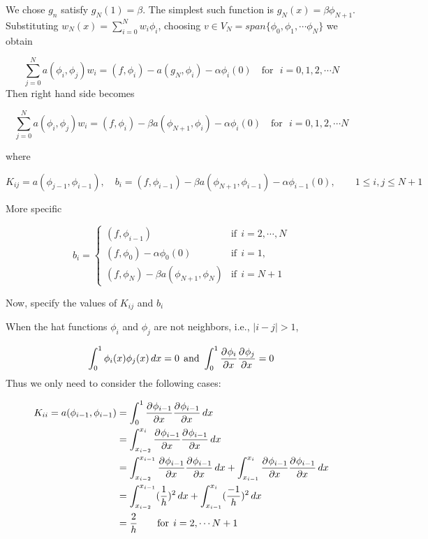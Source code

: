 {\begin{solution}
\begin{enumerate}
We chose $g_n$ satisfy $g_N(1) = \beta$. The simplest such function is $g_N(x)= \beta \phi_{N+1}$. Substituting $w_N(x)= \sum_{i=0}^{N} w_i \phi_i$,  choosing $v \in V_N= span\{\phi_0, \phi_1, \cdots \phi_N\}$ we obtain

\[
\sum_{j=0}^{N} a(\phi_i,\phi_j) w_i = (f,\phi_i)-a(g_N, \phi_i)-\alpha \phi_i (0) \quad \mbox{for} \:\:\: i=0,1, 2,\cdots N
\]
Then right hand side becomes

\[
\sum_{j=0}^{N} a(\phi_i,\phi_j) w_i = (f,\phi_i)- \beta a(\phi_{N+1}, \phi_i)-\alpha \phi_i (0)  \quad \mbox{for} \:\:\: i=0,1, 2,\cdots N
\]

where 

\[
K_{ij} = a(\phi_{j-1},\phi_{i-1}), \quad b_i = (f,\phi_{i-1}) -\beta a(\phi_{N+1}, \phi_{i-1})-\alpha \phi_{i-1} (0), \qquad 1 \leq i, j \leq N+1
\]

More specific

\[
b_i = \begin{cases}
(f,\phi_{i-1})  & \mbox{if} \:\: i= 2,\cdots, N\\
(f,\phi_{0}) - \alpha \phi_{0} (0)& \mbox{if} \:\: i= 1,\\
(f,\phi_{N}) -\beta a(\phi_{N+1}, \phi_{N}) & \mbox{if} \:\: i= N+1
\end{cases}
\]

Now, specify the values of $K_{ij}$ and $b_i$


When the hat functions $\phi_i$ and $\phi_j$ are not neighbors, i.e., $|i-j|>1$, 

\[ \int_0^1 \phi_i(x) \phi_j (x) \, dx  = 0 \:\: \mbox{and }  \int_0^1 \frac{\partial^{} \phi_{i}}{\partial x^{}} \frac{\partial^{} \phi_{j}}{\partial x^{}} = 0 \]
Thus we only need to consider the following cases:

\begin{align*}
K_{ii}= a(\phi_{i-1},\phi_{i-1}) &= \int_0^1 \frac{\partial^{} \phi_{i-1}}{\partial x^{}} \frac{\partial^{} \phi_{i-1}}{\partial x^{}} \, dx\\
																 &= \int_{x_{i-2}}^{x_{i}} \frac{\partial^{} \phi_{i-1}}{\partial x^{}} \frac{\partial^{} \phi_{i-1}}{\partial x^{}} \, dx\\
																 &= \int_{x_{i-2}}^{x_{i-1}} \frac{\partial^{} \phi_{i-1}}{\partial x^{}} \frac{\partial^{} \phi_{i-1}}{\partial x^{}} \,dx +  \int_{x_{i-1}}^{x_{i}} \frac{\partial^{} \phi_{i-1}}{\partial x^{}} \frac{\partial^{} \phi_{i-1}}{\partial x^{}}\, dx\\
																 &=\int_{x_{i-2}}^{x_{i-1}} (\frac{1}{h})^2 \, dx +  \int_{x_{i-1}}^{x_{i}} (\frac{-1}{h})^2 \, dx\\
																 &=\frac{2}{h} \qquad \mbox{for}\:\: i=2,\cdots N+1
\end{align*}


\end{enumerate}
\end{solution}}
